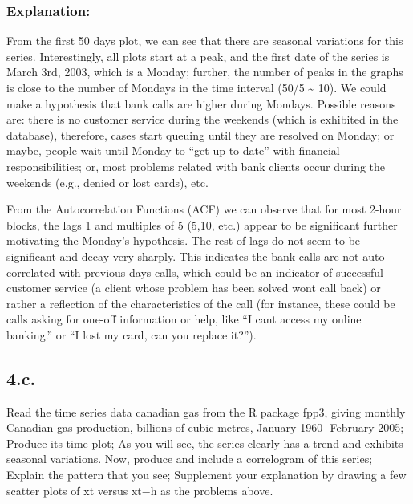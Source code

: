 \documentclass[
]{article}
\begin{document}
\hypertarget{explanation-1}{%
\subsubsection{Explanation:}\label{explanation-1}}

From the first 50 days plot, we can see that there are seasonal
variations for this series. Interestingly, all plots start at a peak,
and the first date of the series is March 3rd, 2003, which is a Monday;
further, the number of peaks in the graphs is close to the number of
Mondays in the time interval (50/5 \textasciitilde{} 10). We could make
a hypothesis that bank calls are higher during Mondays. Possible reasons
are: there is no customer service during the weekends (which is
exhibited in the database), therefore, cases start queuing until they
are resolved on Monday; or maybe, people wait until Monday to ``get up
to date'' with financial responsibilities; or, most problems related
with bank clients occur during the weekends (e.g., denied or lost
cards), etc.

From the Autocorrelation Functions (ACF) we can observe that for most
2-hour blocks, the lags 1 and multiples of 5 (5,10, etc.) appear to be
significant further motivating the Monday's hypothesis. The rest of lags
do not seem to be significant and decay very sharply. This indicates the
bank calls are not auto correlated with previous days calls, which could
be an indicator of successful customer service (a client whose problem
has been solved wont call back) or rather a reflection of the
characteristics of the call (for instance, these could be calls asking
for one-off information or help, like ``I cant access my online
banking.'' or ``I lost my card, can you replace it?'').

\hypertarget{c.}{%
\subsection{4.c.}\label{c.}}

Read the time series data canadian gas from the R package fpp3, giving
monthly Canadian gas production, billions of cubic metres, January 1960-
February 2005; Produce its time plot; As you will see, the series
clearly has a trend and exhibits seasonal variations. Now, produce and
include a correlogram of this series; Explain the pattern that you see;
Supplement your explanation by drawing a few scatter plots of xt versus
xt−h as the problems above.
\end{document}

